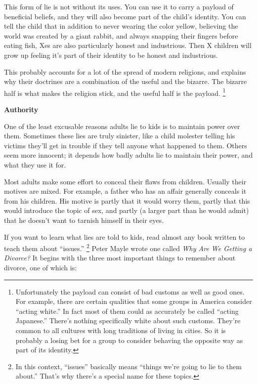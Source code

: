 \documentclass[12pt]{book}
\begin{document}
This form of lie is not without its uses. You can use it to carry a
payload of beneficial beliefs, and they will also become part of the
child's identity. You can tell the child that in addition to never
wearing the color yellow, believing the world was created by a giant
rabbit, and always snapping their fingers before eating fish, Xes are
also particularly honest and industrious. Then X children will grow up
feeling it's part of their identity to be honest and industrious.

This probably accounts for a lot of the spread of modern religions, and
explains why their doctrines are a combination of the useful and the
bizarre. The bizarre half is what makes the religion stick, and the
useful half is the payload. \footnote{Unfortunately the payload can consist of bad customs as well as
good ones. For example, there are certain qualities that some groups in
America consider ``acting white.'' In fact most of them could as
accurately be called ``acting Japanese.'' There's nothing specifically
white about such customs. They're common to all cultures with long
traditions of living in cities. So it is probably a losing bet for a
group to consider behaving the opposite way as part of its identity.}

\textbf{Authority}

One of the least excusable reasons adults lie to kids is to maintain
power over them. Sometimes these lies are truly sinister, like a child
molester telling his victims they'll get in trouble if they tell anyone
what happened to them. Others seem more innocent; it depends how badly
adults lie to maintain their power, and what they use it for.

Most adults make some effort to conceal their flaws from children.
Usually their motives are mixed. For example, a father who has an affair
generally conceals it from his children. His motive is partly that it
would worry them, partly that this would introduce the topic of sex, and
partly (a larger part than he would admit) that he doesn't want to
tarnish himself in their eyes.

If you want to learn what lies are told to kids, read almost any book
written to teach them about ``issues.'' \footnote{In this context, ``issues'' basically means ``things we're going
to lie to them about.'' That's why there's a special name for these
topics.} Peter
Mayle wrote one called \emph{Why Are We Getting a Divorce?} It begins
with the three most important things to remember about divorce, one of
which is:
\end{document}
